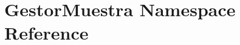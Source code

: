 \hypertarget{namespace_gestor_muestra}{}\section{Gestor\+Muestra Namespace Reference}
\label{namespace_gestor_muestra}
